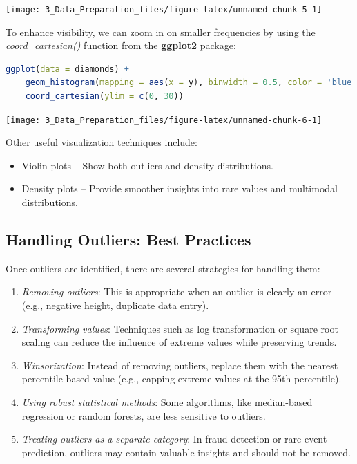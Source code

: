 \documentclass[
  11pt,
]{book}
\providecommand{\tightlist}{%
  \setlength{\itemsep}{0pt}\setlength{\parskip}{0pt}}
\theoremstyle{definition}
\theoremstyle{definition}
\theoremstyle{definition}
\theoremstyle{definition}
\theoremstyle{remark}
\begin{document}
\begin{center}\texttt{[image: 3\_Data\_Preparation\_files/figure-latex/unnamed-chunk-5-1]} \end{center}

To enhance visibility, we can zoom in on smaller frequencies by using the \emph{coord\_cartesian()} function from the \textbf{ggplot2} package:

\begin{lstlisting}[language=R]
ggplot(data = diamonds) +
    geom_histogram(mapping = aes(x = y), binwidth = 0.5, color = 'blue', fill = "lightblue") + 
    coord_cartesian(ylim = c(0, 30))
\end{lstlisting}

\begin{center}\texttt{[image: 3\_Data\_Preparation\_files/figure-latex/unnamed-chunk-6-1]} \end{center}

Other useful visualization techniques include:

\begin{itemize}
\tightlist
\item
  Violin plots -- Show both outliers and density distributions.
\item
  Density plots -- Provide smoother insights into rare values and multimodal distributions.
\end{itemize}

\subsection*{Handling Outliers: Best Practices}\label{handling-outliers-best-practices}


Once outliers are identified, there are several strategies for handling them:

\begin{enumerate}
\def\labelenumi{\arabic{enumi}.}
\tightlist
\item
  \emph{Removing outliers}: This is appropriate when an outlier is clearly an error (e.g., negative height, duplicate data entry).
\item
  \emph{Transforming values}: Techniques such as log transformation or square root scaling can reduce the influence of extreme values while preserving trends.
\item
  \emph{Winsorization}: Instead of removing outliers, replace them with the nearest percentile-based value (e.g., capping extreme values at the 95th percentile).
\item
  \emph{Using robust statistical methods}: Some algorithms, like median-based regression or random forests, are less sensitive to outliers.
\item
  \emph{Treating outliers as a separate category}: In fraud detection or rare event prediction, outliers may contain valuable insights and should not be removed.
\end{enumerate}
\end{document}
